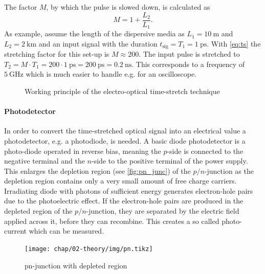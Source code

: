 The factor $M$, by which the pulse is slowed down, is calculated as
\begin{equation}\label{eq:ts}
	M = 1 + \frac{L_2}{L_1}.
\end{equation}
As example, assume the length of the dispersive media as $L_1 = \SI{10}{\meter}$ and $L_2 = \SI{2}{\kilo \meter}$ and an input signal with the duration $t_\text{sig} = T_1 = \SI{1}{\pico \second}$. 
With \autoref{eq:ts} the stretching factor for this set-up is $M \approx 200$. The input pulse is stretched to $T_2 = M \cdot T_1 = 200 \cdot \SI{1}{\pico \second} = \SI{200}{\pico \second} = \SI{0.2}{\nano \second}$.
This corresponds to a frequency of $\SI{5}{\GHz}$ which is much easier to handle e.g. for an oscilloscope.

\begin{figure}[H]
	\centering
	\resizebox{1\textwidth}{!}{}
	\caption{Working principle of the electro-optical time-stretch technique \cite{roussel2014}}
	\label{fig:eo_ts}
\end{figure}

\paragraph{Photodetector}
In order to convert the time-stretched optical signal into an electrical value a photodetector, e.g. a photodiode, is needed.
A basic diode photodetector is a photo-diode operated in reverse bias, meaning the $p$-side is connected to the negative terminal and the $n$-side to the positive terminal of the power supply. %
This enlarges the depletion region (see \autoref{fig:pn_junc}) of the $p/n$-junction as the depletion region contains only a very small amount of free charge carriers. 
Irradiating diode with photons of sufficient energy generates electron-hole pairs due to the photoelectric effect. %
If the electron-hole pairs are produced in the depleted region of the $p/n$-junction, they are separated by the electric field applied across it, before they can recombine. 
This creates a so called photo-current which can be measured. \cite{photodiode} %

\begin{figure}[H]
	\centering
	\texttt{[image: chap/02-theory/img/pn.tikz]}
	\caption{pn-junction with depleted region \cite{pn-junc}}
	\label{fig:pn_junc}
\end{figure}

